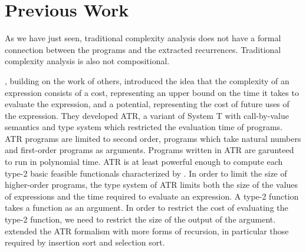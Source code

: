 \section{Previous Work}

As we have just seen, traditional complexity analysis does not have a formal
connection between the programs and the extracted recurrences. Traditional
complexity analysis is also not compositional.



\citet{Danner2007}, building on the work of others, introduced the
idea that the complexity of an expression consists of a cost, representing an
upper bound on the time it takes to evaluate the expression, and a potential,
representing the cost of future uses of the expression. They developed ATR, a
variant of System T with call-by-value semantics and type system which
restricted the evaluation time of programs. ATR programs are limited to second
order, programs which take natural numbers and first-order programs as
arguments. Programs written in ATR are garunteed to run in polynomial time. ATR
is at least powerful enough to compute each type-2 basic feasible functionals
characterized by \citet{KC96}. In order to limit the size of higher-order
programs, the type system of ATR limits both the size of the values of
expressions and the time required to evaluate an expression. A type-2 function
takes a function as an argument. In order to restrict the cost of evaluating
the type-2 function, we need to restrict the size of the output of the argument.
\citet{Danner2009} extended the ATR formalism with more forms of recursion, in
particular those required by insertion sort and selection sort.

